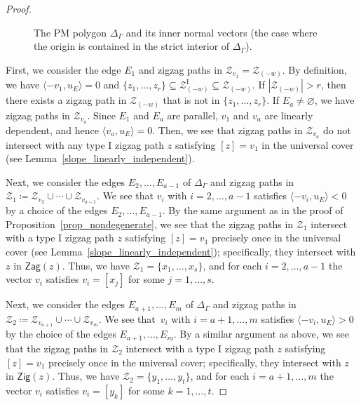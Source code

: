 \documentclass[11pt]{article}
\numberwithin{equation}{section}
\numberwithin{equation}{section}
\numberwithin{figure}{section}
\numberwithin{table}{section}
\newcommand{\rmI}{\mathrm{I}}
\newcommand{\calZ}{\mathcal{Z}}
\newcommand{\Zig}{\mathsf{Zig}}
\newcommand{\Zag}{\mathsf{Zag}}
\begin{document}
\begin{proof}
\begin{figure}[h!]
{
}
\caption{The PM polygon $\Delta_\Gamma$ and its inner normal vectors (the case where the origin is contained in the strict interior of $\Delta_\Gamma$).}
\label{PMpolygon_normalvec}
\end{figure}

First, we consider the edge $E_1$ and zigzag paths in $\calZ_{v_1}=\calZ_{(-w)}$.
By definition, we have $\langle -v_1,u_E\rangle=0$ and $\{z_1,\dots,z_r\}\subseteq\calZ_{(-w)}^\rmI\subseteq \calZ_{(-w)}$.
If $|\calZ_{(-w)}|>r$, then there exists a zigzag path in $\calZ_{(-w)}$ that is not in $\{z_1,\dots,z_r\}$.
If $E_a\neq\varnothing$, we have zigzag paths in $\calZ_{v_a}$.
Since $E_1$ and $E_a$ are parallel, $v_1$ and $v_a$ are linearly dependent, and hence $\langle v_a,u_E\rangle=0$.
Then, we see that zigzag paths in $\calZ_{v_a}$ do not intersect with any type I zigzag path $z$ satisfying $[z]=v_1$ in the universal cover (see Lemma~\ref{slope_linearly_independent}).

Next, we consider the edges $E_2,\dots,E_{a-1}$ of $\Delta_\Gamma$ and zigzag paths in $\calZ_1\coloneqq\calZ_{v_2}\cup\cdots\cup\calZ_{v_{a-1}}$.
We see that $v_i$ with $i=2,\dots,a-1$ satisfies $\langle -v_i,u_E\rangle<0$ by a choice of the edges $E_2,\dots,E_{a-1}$.
By the same argument as in the proof of Proposition~\ref{prop_nondegenerate}, we see that
the zigzag paths in $\calZ_1$ intersect with a type I zigzag path $z$ satisfying $[z]=v_1$ precisely once in the universal cover (see Lemma~\ref{slope_linearly_independent}); specifically, they intersect with $z$ in $\Zag(z)$.
Thus, we have $\calZ_1=\{x_1,\dots,x_s\}$, and for each $i=2,\dots ,a-1$ the vector $v_i$ satisfies $v_i=[x_j]$ for some $j=1,\dots,s$.

Next, we consider the edges $E_{a+1},\dots,E_m$ of $\Delta_\Gamma$ and zigzag paths in $\calZ_2\coloneqq\calZ_{v_{a+1}}\cup\cdots\allowbreak\cup\calZ_{v_m}$.
We see that~$v_i$ with $i=a+1,\dots,m$ satisfies $\langle -v_i,u_E\rangle>0$ by the choice of the edges $E_{a+1},\dots,E_m$.
By a similar argument as above, we see that the zigzag paths in $\calZ_2$ intersect with a type I zigzag path $z$ satisfying $[z]=v_1$ precisely once in the universal cover; specifically, they intersect with $z$ in $\Zig(z)$.
Thus, we have $\calZ_2=\{y_1,\dots,y_t\}$, and for each $i=a+1,\dots,m$ the vector $v_i$ satisfies $v_i=[y_k]$ for some $k=1,\dots,t$.


\end{proof}
\end{document}
